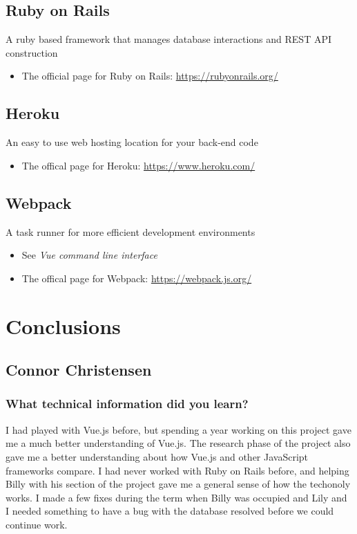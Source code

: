 \documentclass[draftclsnofoot,onecolumn,letterpaper,10pt]{IEEEtran}
\begin{document}
	\subsection{Ruby on Rails}
	A ruby based framework that manages database interactions and REST API construction
	\begin{itemize}
		\item The official page for Ruby on Rails: \hyperlink{https://rubyonrails.org/}{https://rubyonrails.org/}
	\end{itemize}
	\subsection{Heroku}
	An easy to use web hosting location for your back-end code
	\begin{itemize}
		\item The offical page for Heroku: \hyperlink{https://www.heroku.com/}{https://www.heroku.com/}
	\end{itemize}
	\subsection{Webpack}
	A task runner for more efficient development environments
	\begin{itemize}
		\item See {\it Vue command line interface}
		\item The offical page for Webpack: \hyperlink{https://webpack.js.org/}{https://webpack.js.org/}
	\end{itemize}
\section{Conclusions}
	\subsection{Connor Christensen}
		\subsubsection{What technical information did you learn?}

		I had played with Vue.js before, but spending a year working on this project gave me a much better understanding of Vue.js.
		The research phase of the project also gave me a better understanding about how Vue.js and other JavaScript frameworks compare.
		I had never worked with Ruby on Rails before, and helping Billy with his section of the project gave me a general sense of how the techonoly works.
		I made a few fixes during the term when Billy was occupied and Lily and I needed something to have a bug with the database resolved before we could continue work.
\end{document}
